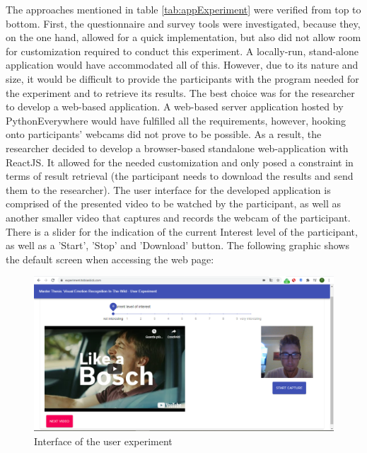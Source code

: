 The approaches mentioned in table \ref{tab:appExperiment} were verified from top to bottom. First, the questionnaire and survey tools were investigated, because they, on the one hand, allowed for a quick implementation, but also did not allow room for customization required to conduct this experiment. A locally-run, stand-alone application would have accommodated all of this. However, due to its nature and size, it would be difficult to provide the participants with the program needed for the experiment and to retrieve its results. The best choice was for the researcher to develop a web-based application.
\newline\newline
A web-based server application hosted by PythonEverywhere would have fulfilled all the requirements, however, hooking onto participants’ webcams did not prove to be possible. As a result, the researcher decided to develop a browser-based standalone web-application with ReactJS. It allowed for the needed customization and only posed a constraint in terms of result retrieval (the participant needs to download the results and send them to the researcher).
\newline\newline
The user interface for the developed application is comprised of the presented video to be watched by the participant, as well as another smaller video that captures and records the webcam of the participant. There is  a slider for the indication of the current Interest level of the participant, as well as a 'Start', 'Stop' and 'Download' button. The following graphic shows the default screen when accessing the web page:

\begin{center}
\begin{figure}[H]
  \begin{center}
  \includegraphics[angle=0, width=1.0\textwidth]{Figures/UserExperiment.PNG}
  \caption{Interface of the user experiment}
  \label{fig:InterfaceUserExperiment}
  \end{center}
\end{figure}
\end{center}

